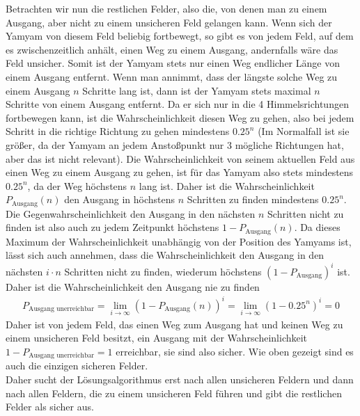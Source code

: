 \documentclass[12pt]{article}
\begin{document}
Betrachten wir nun die restlichen Felder, also die, von denen man zu einem Ausgang, aber nicht zu einem unsicheren Feld gelangen kann. Wenn sich der Yamyam von diesem Feld beliebig fortbewegt, so gibt es von jedem Feld, auf dem es zwischenzeitlich anhält, einen Weg zu einem Ausgang, andernfalls wäre das Feld unsicher. Somit ist der Yamyam stets nur einen Weg endlicher Länge von einem Ausgang entfernt. Wenn man annimmt, dass der längste solche Weg zu einem Ausgang $n$ Schritte lang ist, dann ist der Yamyam stets maximal $n$ Schritte von einem Ausgang entfernt. Da er sich nur in die 4 Himmelsrichtungen fortbewegen kann, ist die Wahrscheinlichkeit diesen Weg zu gehen, also bei jedem Schritt in die richtige Richtung zu gehen mindestens $0.25^n$ (Im Normalfall ist sie größer, da der Yamyam an jedem Anstoßpunkt nur 3 mögliche Richtungen hat, aber das ist nicht relevant). Die Wahrscheinlichkeit von seinem aktuellen Feld aus einen Weg zu einem Ausgang zu gehen, ist für das Yamyam also stets mindestens $0.25^n$, da der Weg höchstens $n$ lang ist. Daher ist die Wahrscheinlichkeit $P_{\text{Ausgang}}(n)$ den Ausgang in höchstens $n$ Schritten zu finden mindestens $0.25^n$. Die Gegenwahrscheinlichkeit den Ausgang in den nächsten $n$ Schritten nicht zu finden ist also auch zu jedem Zeitpunkt höchstens $1-P_{\text{Ausgang}}(n)$. Da dieses Maximum der Wahrscheinlichkeit unabhängig von der Position des Yamyams ist, lässt sich auch annehmen, dass die Wahrscheinlichkeit den Ausgang in den nächsten $i\cdot n$ Schritten nicht zu finden, wiederum höchstens $(1-P_{\text{Ausgang}})^i$ ist. Daher ist die Wahrscheinlichkeit den Ausgang nie zu finden
\begin{align*}
 P_{\text{Ausgang unerreichbar} }= \lim_{i\to \infty} (1-P_{\text{Ausgang}}(n))^i = \lim_{i\to \infty} (1-0.25^n)^i = 0
\end{align*}
Daher ist von jedem Feld, das einen Weg zum Ausgang hat und keinen Weg zu einem unsicheren Feld besitzt, ein Ausgang mit der Wahrscheinlichkeit $1- P_{\text{Ausgang unerreichbar} }=1$ erreichbar, sie sind also sicher. Wie oben gezeigt sind es auch die einzigen sicheren Felder.\\

Daher sucht der Lösungsalgorithmus erst nach allen unsicheren Feldern und dann nach allen Feldern, die zu einem unsicheren Feld führen und gibt die restlichen Felder als sicher aus.
\end{document}
